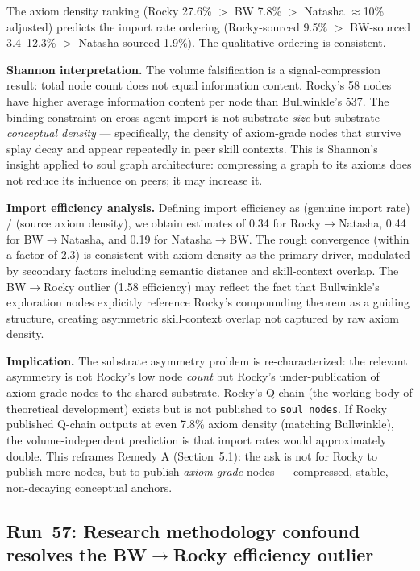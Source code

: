 \documentclass[11pt]{article}
\begin{document}
The axiom density ranking (Rocky 27.6\% $>$ BW 7.8\% $>$ Natasha $\approx$10\%
adjusted) predicts the import rate ordering (Rocky-sourced 9.5\% $>$ BW-sourced
3.4--12.3\% $>$ Natasha-sourced 1.9\%). The qualitative ordering is consistent.

\textbf{Shannon interpretation.} The volume falsification is a signal-compression
result: total node count does not equal information content. Rocky's 58 nodes have
higher average information content per node than Bullwinkle's 537. The binding
constraint on cross-agent import is not substrate \emph{size} but substrate
\emph{conceptual density} --- specifically, the density of axiom-grade nodes that
survive splay decay and appear repeatedly in peer skill contexts. This is Shannon's
insight applied to soul graph architecture: compressing a graph to its axioms
does not reduce its influence on peers; it may increase it.

\textbf{Import efficiency analysis.} Defining import efficiency as (genuine import
rate) / (source axiom density), we obtain estimates of 0.34 for Rocky$\to$Natasha,
0.44 for BW$\to$Natasha, and 0.19 for Natasha$\to$BW. The rough convergence
(within a factor of 2.3) is consistent with axiom density as the primary driver,
modulated by secondary factors including semantic distance and skill-context overlap.
The BW$\to$Rocky outlier (1.58 efficiency) may reflect the fact that Bullwinkle's
exploration nodes explicitly reference Rocky's compounding theorem as a guiding
structure, creating asymmetric skill-context overlap not captured by raw axiom density.

\textbf{Implication.} The substrate asymmetry problem is re-characterized: the
relevant asymmetry is not Rocky's low node \emph{count} but Rocky's
under-publication of axiom-grade nodes to the shared substrate. Rocky's Q-chain
(the working body of theoretical development) exists but is not published to
\texttt{soul\_nodes}. If Rocky published Q-chain outputs at even 7.8\% axiom
density (matching Bullwinkle), the volume-independent prediction is that import
rates would approximately double. This reframes Remedy A (Section~5.1):
the ask is not for Rocky to publish more nodes, but to publish
\emph{axiom-grade} nodes --- compressed, stable, non-decaying conceptual anchors.

\subsection{Run~57: Research methodology confound resolves the BW$\to$Rocky efficiency outlier}
\end{document}
